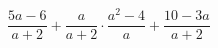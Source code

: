 \begin{ex}[type=expression]
	\begin{condition}
		\(\dfrac{5a-6}{a+2}+\dfrac{a}{a+2}\cdot\dfrac{a^2-4}{a}+\dfrac{10-3a}{a+2}\)
	\end{condition}
\end{ex}